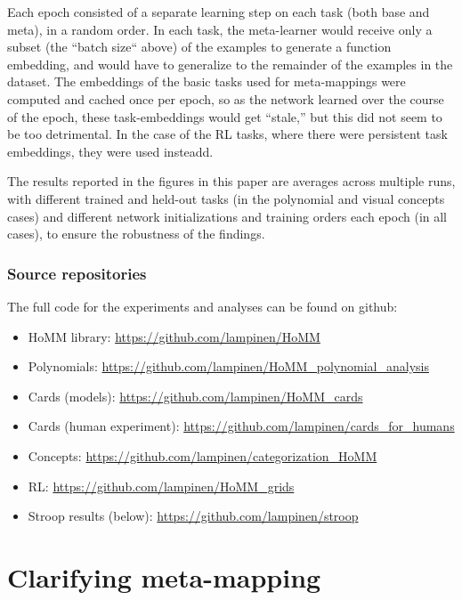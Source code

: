 Each epoch consisted of a separate learning step on each task (both base and meta), in a random order. In each task, the meta-learner would receive only a subset (the ``batch size`` above) of the examples to generate a function embedding, and would have to generalize to the remainder of the examples in the dataset. The embeddings of the basic tasks used for meta-mappings were computed and cached once per epoch, so as the network learned over the course of the epoch, these task-embeddings would get ``stale,'' but this did not seem to be too detrimental. In the case of the RL tasks, where there were persistent task embeddings, they were used insteadd.\par
The results reported in the figures in this paper are averages across multiple runs, with different trained and held-out tasks (in the polynomial and visual concepts cases) and different network initializations and training orders each epoch (in all cases), to ensure the robustness of the findings. \par

\subsubsection{Source repositories}
The full code for the experiments and analyses can be found on github:
\begin{itemize}
\item HoMM library: \url{https://github.com/lampinen/HoMM}
\item Polynomials: \url{https://github.com/lampinen/HoMM_polynomial_analysis}
\item Cards (models): \url{https://github.com/lampinen/HoMM_cards}
\item Cards (human experiment): \url{https://github.com/lampinen/cards_for_humans}
\item Concepts: \url{https://github.com/lampinen/categorization_HoMM}
\item RL: \url{https://github.com/lampinen/HoMM_grids}
\item Stroop results (below): \url{https://github.com/lampinen/stroop}
\end{itemize}



\section{Clarifying meta-mapping} \label{app_clarifying_meta_mapping}
